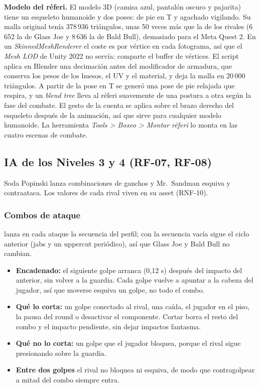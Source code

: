 \textbf{Modelo del réferi.} El modelo 3D (camisa azul, pantalón oscuro y pajarita) tiene un esqueleto humanoide y dos poses: de pie en T y agachado vigilando. Su malla original tenía 378\,936 triángulos, unas 50 veces más que la de los rivales (6\,652 la de Glass Joe y 8\,636 la de Bald Bull), demasiado para el Meta Quest 2. En un \emph{SkinnedMeshRenderer} el coste es por vértice en cada fotograma, así que el \emph{Mesh LOD} de Unity 2022 no servía: comparte el buffer de vértices. El script  aplica en Blender una decimación antes del modificador de armadura, que conserva los pesos de los huesos, el UV y el material, y deja la malla en 20\,000 triángulos. A partir de la pose en T se generó una pose de pie relajada que respira, y un \emph{blend tree} lleva al réferi suavemente de una postura a otra según la fase del combate. El gesto de la cuenta se aplica sobre el brazo derecho del esqueleto después de la animación, así que sirve para cualquier modelo humanoide. La herramienta \emph{Tools > Boxeo > Montar réferi} lo monta en las cuatro escenas de combate.

\subsection{IA de los Niveles 3 y 4 (RF-07, RF-08)}
\label{sec:ia}
Soda Popinski lanza combinaciones de ganchos y Mr.\ Sandman esquiva y contraataca. Los valores de cada rival viven en su asset  (RNF-10).

\subsubsection{Combos de ataque}
 lanza en cada ataque la secuencia  del perfil; con la secuencia vacía sigue el ciclo anterior (jabs y un uppercut periódico), así que Glass Joe y Bald Bull no cambian.
\begin{itemize}
  \item \textbf{Encadenado:} el siguiente golpe arranca  (0,12 s) después del impacto del anterior, sin volver a la guardia. Cada golpe vuelve a apuntar a la cabeza del jugador, así que moverse esquiva un golpe, no todo el combo.
  \item \textbf{Qué lo corta:} un golpe conectado al rival, una caída, el jugador en el piso, la pausa del round o desactivar el componente. Cortar borra el resto del combo y el impacto pendiente, sin dejar impactos fantasma.
  \item \textbf{Qué no lo corta:} un golpe que el jugador bloquea, porque el rival sigue presionando sobre la guardia.
  \item \textbf{Entre dos golpes} el rival no bloquea ni esquiva, de modo que contragolpear a mitad del combo siempre entra.
\end{itemize}

